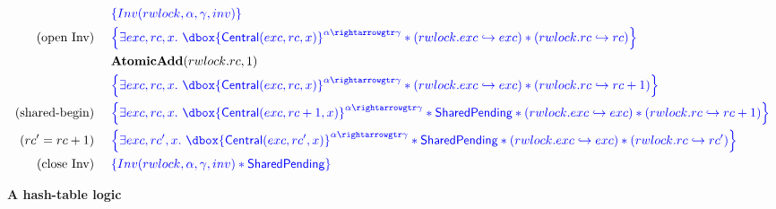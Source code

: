 \documentclass{article}
\newcommand\dboxed[1]{\dbox{\vphantom{t}\ensuremath{#1}}}
\newcommand{\pointsto}{\hookrightarrow}
\newcommand{\refines}{\rightarrowgtr}
\begin{document}
\begin{align*}
& \inlinehoare{ \Inv(\rwlock,\alpha,\gamma,\inv) } \\
\text{(open Inv)} ~~~~ & \inlinehoare{
        \exists exc,rc,x .~
            \dboxed{\Central(exc,rc,x)}^{\alpha \refines \gamma}
            * (\rwlock.\exc \pointsto exc)
            * (\rwlock.\rc \pointsto rc)
    }\\
& \AtomicAdd(\rwlock.\rc, 1) \\
& \inlinehoare{
        \exists exc,rc,x .~
            \dboxed{\Central(exc,rc,x)}^{\alpha \refines \gamma}
            * (\rwlock.\exc \pointsto exc)
            * (\rwlock.\rc \pointsto rc + 1)
    }\\
\text{(shared-begin)} ~~~~ & \inlinehoare{
        \exists exc,rc,x .~
            \dboxed{\Central(exc,rc + 1,x)}^{\alpha \refines \gamma}
            * \SharedPending
            * (\rwlock.\exc \pointsto exc)
            * (\rwlock.\rc \pointsto rc + 1)
    }\\
(rc'=rc+1) ~~~~ & \inlinehoare{
        \exists exc,rc',x .~
            \dboxed{\Central(exc,rc',x)}^{\alpha \refines \gamma}
            * \SharedPending
            * (\rwlock.\exc \pointsto exc)
            * (\rwlock.\rc \pointsto rc')
    }\\
\text{(close Inv)} ~~~~ & \inlinehoare{ \Inv(\rwlock,\alpha,\gamma,\inv) * \SharedPending } \nonumber\\
\end{align*}

\newpage

\textbf{A hash-table logic}

\newcommand{\hashto}{\stackrel{\text{hash}}{\hookrightarrow}}
\newcommand{\entryto}{\stackrel{\text{entry}}{\hookrightarrow}}
\newcommand{\Some}{\text{Some}}
\newcommand{\None}{\text{None}}

\newcommand{\Query}{\text{Query}}
\newcommand{\QueryIter}{\text{QueryIter}}
\newcommand{\Update}{\text{Update}}
\newcommand{\UpdateIter}{\text{UpdateIter}}
\newcommand{\Remove}{\text{Remove}}
\newcommand{\RemoveIter}{\text{RemoveIter}}
\newcommand{\NotInRange}{\text{NotInRange}}

\newcommand{\hash}{\ensuremath{hash}}
\newcommand{\rec}{\textbf{rec}}
\end{document}

